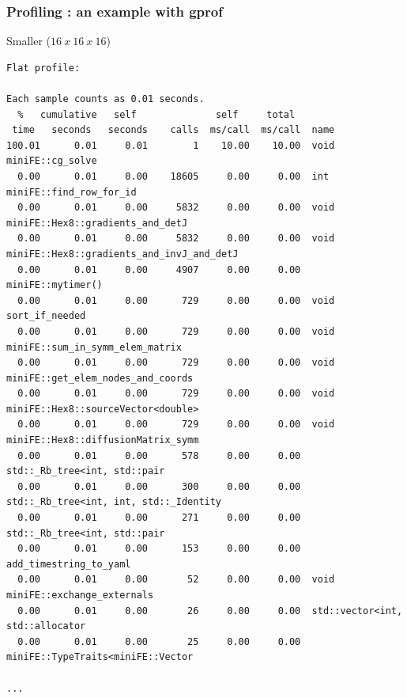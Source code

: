 \begin{frame}[containsverbatim]
	\frametitle{Profiling : an example with gprof}

Smaller ($16~x~16~x~16$)

	\begin{Verbatim}[fontsize=\tiny]
Flat profile:

Each sample counts as 0.01 seconds.
  %   cumulative   self              self     total           
 time   seconds   seconds    calls  ms/call  ms/call  name    
100.01      0.01     0.01        1    10.00    10.00  void miniFE::cg_solve
  0.00      0.01     0.00    18605     0.00     0.00  int miniFE::find_row_for_id
  0.00      0.01     0.00     5832     0.00     0.00  void miniFE::Hex8::gradients_and_detJ
  0.00      0.01     0.00     5832     0.00     0.00  void miniFE::Hex8::gradients_and_invJ_and_detJ
  0.00      0.01     0.00     4907     0.00     0.00  miniFE::mytimer()
  0.00      0.01     0.00      729     0.00     0.00  void sort_if_needed
  0.00      0.01     0.00      729     0.00     0.00  void miniFE::sum_in_symm_elem_matrix
  0.00      0.01     0.00      729     0.00     0.00  void miniFE::get_elem_nodes_and_coords
  0.00      0.01     0.00      729     0.00     0.00  void miniFE::Hex8::sourceVector<double>
  0.00      0.01     0.00      729     0.00     0.00  void miniFE::Hex8::diffusionMatrix_symm
  0.00      0.01     0.00      578     0.00     0.00  std::_Rb_tree<int, std::pair
  0.00      0.01     0.00      300     0.00     0.00  std::_Rb_tree<int, int, std::_Identity
  0.00      0.01     0.00      271     0.00     0.00  std::_Rb_tree<int, std::pair
  0.00      0.01     0.00      153     0.00     0.00  add_timestring_to_yaml
  0.00      0.01     0.00       52     0.00     0.00  void miniFE::exchange_externals
  0.00      0.01     0.00       26     0.00     0.00  std::vector<int, std::allocator
  0.00      0.01     0.00       25     0.00     0.00  miniFE::TypeTraits<miniFE::Vector

...
	\end{Verbatim}
\end{frame}


